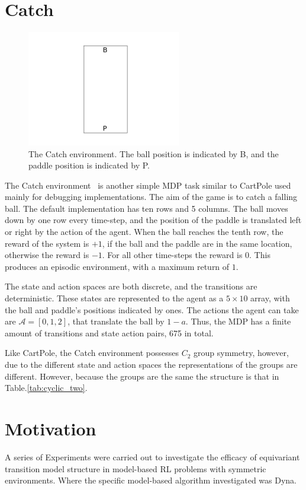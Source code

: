 \section{Catch}\label{sec:catch}
\begin{figure}[h!]
	\centering
	\includegraphics[width = 0.6\textwidth]{Figures/catch_env.png}
	\caption{The Catch environment. The ball position is indicated by B, and the paddle position is indicated by P.}
	\label{fig:catch_env}
\end{figure}
The Catch environment~\cite{osband2020bsuite} is another simple MDP task similar to CartPole used mainly for debugging implementations. The aim of the game is to catch a falling ball. The default implementation has ten rows and 5 columns. The ball moves down by one row every time-step, and the position of the paddle is translated left or right by the action of the agent. When the ball reaches the tenth row, the reward of the system is $+1$, if the ball and the paddle are in the same location, otherwise the reward is $-1$. For all other time-steps the reward is 0. This produces an episodic environment, with a maximum return of $1$.

The state and action spaces are both discrete, and the transitions are deterministic. These states are represented to the agent as a $5\times 10$ array, with the ball and paddle's positions indicated by ones. The actions the agent can take are $\mathcal{A} = [0, 1, 2]$, that translate the ball by $1-a$. Thus, the MDP has a finite amount of transitions and state action pairs, 675 in total.

Like CartPole, the Catch environment possesses $C_2$ group symmetry, however, due to the different state and action spaces the representations of the groups are different. However, because the groups are the same the structure is that in Table.\ref{tab:cyclic_two}.

\section{Motivation}
A series of Experiments were carried out to investigate the efficacy of equivariant transition model structure in model-based RL problems with symmetric environments. Where the specific model-based algorithm investigated was Dyna.

